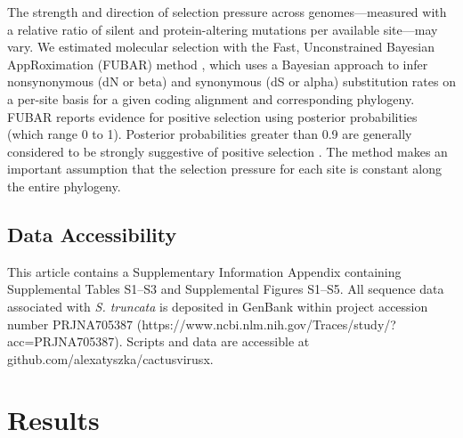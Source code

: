 \documentclass[fleqn,10pt,lineno]{wlpeerj}
\begin{document}
The strength and direction of selection pressure across genomes---measured with a relative ratio of silent and protein-altering mutations per available site---may vary. 
We estimated molecular selection with the Fast, Unconstrained Bayesian AppRoximation (FUBAR) method \citep{murrell2013}, which uses a Bayesian approach to infer nonsynonymous (dN or beta) and synonymous (dS or alpha) substitution rates on a per-site basis for a given coding alignment and corresponding phylogeny. 
FUBAR reports evidence for positive selection using posterior probabilities (which range 0 to 1).
Posterior probabilities greater than 0.9 are generally considered to be strongly suggestive of positive selection \citep{murrell2013}.
The method makes an important assumption that the selection pressure for each site is constant along the entire phylogeny.

\subsection*{Data Accessibility}

This article contains a Supplementary Information Appendix containing Supplemental Tables S1--S3 and Supplemental Figures S1--S5. 
All sequence data associated with \textit{S. truncata} is deposited in GenBank within project accession number PRJNA705387 (https://www.ncbi.nlm.nih.gov/Traces/study/?acc=PRJNA705387). Scripts and data are accessible at github.com/alexatyszka/cactusvirusx.


\section*{Results}
\end{document}
